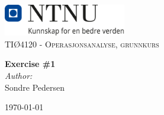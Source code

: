 

\begin{titlepage}
    \vbox{ }
    \vbox{ }
    \begin{center}
        \includegraphics[width=0.40\textwidth]{NTNU_logo.png}\\[1cm]
    \textsc{\Large TIØ4120 - Operasjonsanalyse, grunnkurs}\\[0.5cm]
    \vbox{ }
    
    { \huge \bfseries Exercise \#1}\\[0.4cm]
    
    \large
    \emph{Author:}\\
    Sondre Pedersen
    \vfill
    
    {\large\today}
\end{center}
\end{titlepage}